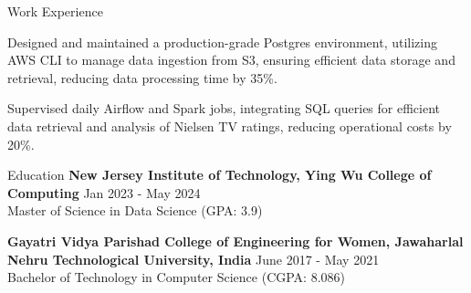 \documentclass{resume} %
\begin{document}
\begin{rSection}{Work Experience}
\begin{rSubsection}
                                    \item Designed and maintained a production{-}grade Postgres environment, utilizing AWS CLI to manage data ingestion from S3, ensuring efficient data storage and retrieval, reducing data processing time by 35\%.
                                    \item Supervised daily Airflow and Spark jobs, integrating SQL queries for efficient data retrieval and analysis of Nielsen TV ratings, reducing operational costs by 20\%.
                            \end{rSubsection}
            \end{rSection}

\begin{rSection}{Education}
                        \textbf{New Jersey Institute of Technology, Ying Wu College of Computing} \hfill {Jan 2023 - May 2024} \\
                            {Master of Science in Data Science (GPA: 3.9)}
                         
             
         
                        \textbf{Gayatri Vidya Parishad College of Engineering for Women, Jawaharlal Nehru Technological University, India} \hfill {June 2017 - May 2021} \\
                            {Bachelor of Technology in Computer Science (CGPA: 8.086)}
                         
             
         
    \end{rSection}
\end{document}
